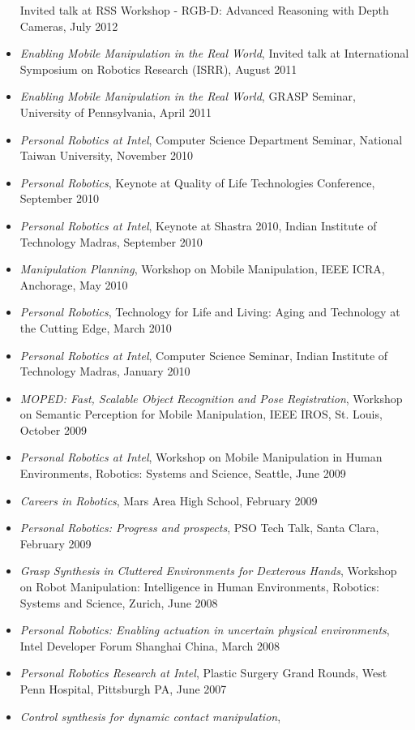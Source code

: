 \documentclass[10pt]{article}
\begin{document}
\begin{itemize}
Invited talk at RSS Workshop - RGB-D: Advanced Reasoning with Depth Cameras, July 2012
\item \textit{Enabling Mobile Manipulation in the Real World},
Invited talk at International Symposium on Robotics Research (ISRR), August 2011
\item \textit{Enabling Mobile Manipulation in the Real World},
GRASP Seminar, University of Pennsylvania, April 2011
\item \textit{Personal Robotics at Intel},
Computer Science Department Seminar, National Taiwan University, November 2010
\item \textit{Personal Robotics},
Keynote at Quality of Life Technologies Conference, September 2010
\item \textit{Personal Robotics at Intel},
Keynote at Shastra 2010, Indian Institute of Technology Madras, September 2010
\item \textit{Manipulation Planning},
Workshop on Mobile Manipulation, IEEE ICRA, Anchorage, May 2010
\item \textit{Personal Robotics},
Technology for Life and Living: Aging and Technology at the Cutting Edge, March 2010
\item \textit{Personal Robotics at Intel},
Computer Science Seminar, Indian Institute of Technology Madras, January 2010
\item \textit{MOPED: Fast, Scalable Object Recognition and Pose Registration},
Workshop on Semantic Perception for Mobile Manipulation,
IEEE IROS, St. Louis, October 2009
\item \textit{Personal Robotics at Intel},
Workshop on Mobile Manipulation in Human Environments,
Robotics: Systems and Science, Seattle, June 2009
\item \textit{Careers in Robotics},
Mars Area High School, February 2009
\item \textit{Personal Robotics: Progress and prospects},
PSO Tech Talk, Santa Clara, February 2009
\item \textit{Grasp Synthesis in Cluttered Environments for Dexterous Hands},
Workshop on Robot Manipulation: Intelligence in Human Environments,
Robotics: Systems and Science, Zurich, June 2008
\item \textit{Personal Robotics: Enabling actuation in uncertain physical environments},
Intel Developer Forum Shanghai China, March 2008
\item \textit{Personal Robotics Research at Intel},
Plastic Surgery Grand Rounds, West Penn Hospital, Pittsburgh PA, June 2007
\item \textit{Control synthesis for dynamic contact manipulation},

\end{itemize}
\end{document}
